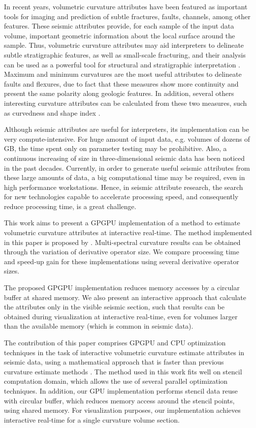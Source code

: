\documentclass[conference]{IEEEtran}
\begin{document}
In recent years, volumetric curvature attributes have been featured as important tools for imaging and prediction of subtle fractures, faults, channels, among other features. These seismic attributes provide, for each sample of the input data volume, important geometric information about the local surface around the sample. Thus, volumetric curvature attributes may aid interpreters to delineate subtle stratigraphic features, as well as small-scale fracturing, and their analysis can be used as a powerful tool for structural and stratigraphic interpretation \cite{martins}. Maximum and minimum curvatures are the most useful attributes to delineate faults and flexures, due to fact that these measures show more continuity and present the same polarity along geologic features. In addition, several others interesting curvature attributes can be calculated from these two measures, such as curvedness and shape index \cite{martinsthesis}.

Although seismic attributes are useful for interpreters, its implementation can be very compute-intensive. For huge amount of input data, e.g. volumes of dozens of GB, the time spent only on parameter testing may be prohibitive. Also, a continuous increasing of size in three-dimensional seismic data has been noticed in the past decades. Currently, in order to generate useful seismic attributes from these large amounts of data, a big computational time may be required, even in high performance workstations. Hence, in seismic attribute research, the search for new technologies capable to accelerate processing speed, and consequently reduce processing time, is a great challenge.

This work aims to present a GPGPU implementation of a method to estimate volumetric curvature attributes at interactive real-time. The method implemented in this paper is proposed by \cite{martins}. Multi-spectral curvature results can be obtained through the variation of derivative operator size. We compare processing time and speed-up gain for these implementations using several derivative operator sizes.

The proposed GPGPU implementation reduces memory accesses by a circular buffer at shared memory. We also present an interactive approach that calculate the attributes only in the visible seismic section, such that results can be obtained during visualization at interactive real-time, even for volumes larger than the available memory (which is common in seismic data).

The contribution of this paper comprises GPGPU and CPU optimization techniques in the task of interactive volumetric curvature estimate attributes in seismic data, using a mathematical approach that is faster than previous curvature estimate methods \cite{martinsthesis}. The method used in this work fits well on stencil computation domain, which allows the use of several parallel optimization techniques. In addition, our GPU implementation performs stencil data reuse with circular buffer, which reduces memory access around the stencil points, using shared memory. For visualization purposes, our implementation achieves interactive real-time for a single curvature volume section.
\end{document}
